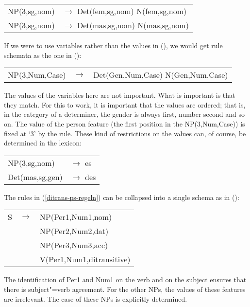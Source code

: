 \ea
\begin{tabular}[t]{@{}l@{ }l}
NP(3,sg,nom)  & $\to$ Det(fem,sg,nom) N(fem,sg,nom)\\
NP(3,sg,nom)  & $\to$ Det(mas,sg,nom) N(mas,sg,nom)\\
\end{tabular}
\z
If we were to use variables rather than the values in (), we would get rule schemata as the
one in ():
\ea
\label{Regel-mit-Variablen}
\begin{tabular}[t]{@{}l@{ }l@{ }l}
NP({3},{Num},{Case}) & $\to$ & Det(Gen,{Num},{Case}) N(Gen,{Num},{Case})\\
\end{tabular}
\z
The values of the variables here are not important. What is important is that they match. For this
to work, it is important that the values are ordered; that is, in the category of a determiner, the gender is always first, number
second and so on. The value of the person feature (the first position in the NP(3,Num,Case)) is fixed at `3' by the rule. These
kind of restrictions on the values can, of course, be determined in the lexicon: 
\ea
\begin{tabular}[t]{@{}l@{ }l}
NP(3,sg,nom)  & $\to$ es\\
Det(mas,sg,gen)  & $\to$ des\\
\end{tabular}
\z

\noindent
The rules in (\ref{ditrans-ps-regeln})  can be collapsed into a single schema as in ():
\ea
\label{ditrans-schema}
\begin{tabular}[t]{@{}l@{ }l@{ }l}
S  & $\to$ & NP({Per1},{Num1},{nom}) \\
   &       & NP(Per2,Num2,{dat})\\
   &       & NP(Per3,Num3,{acc})\\
   &       & V({Per1},{Num1},ditransitive)\\
\end{tabular}
\z
The identification of Per1 and Num1 on the verb and on the subject ensures that there is subject"=verb agreement.
For the other NPs, the values of these features are irrelevant. The case of these NPs is explicitly determined.


